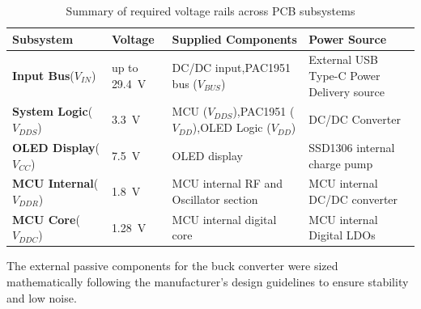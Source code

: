 \begin{table}[htbp]
    \centering
    \renewcommand{\arraystretch}{1.3}
    \caption{Summary of required voltage rails across PCB subsystems}
    \label{tab:voltage_summary}

    \begin{tabularx}{\textwidth}{|>{\centering\arraybackslash}m{2.5cm}|>{\centering\arraybackslash}m{2cm}|X|X|}
        \hline
        \textbf{Subsystem} &
        \textbf{Voltage} &
        \textbf{Supplied Components} &
        \textbf{Power Source} \\
        \hline

        \textbf{Input Bus}\newline($V_{IN}$) & 
        up to \SI{29.4}{\volt} & 
        DC/DC input,\newline PAC1951 bus ($V_{BUS}$) & 
        External USB Type-C Power Delivery source \\
        \hline

        \textbf{System Logic}\newline($V_{DDS}$) & 
        \SI{3.3}{\volt} & 
        MCU ($V_{DDS}$),\newline PAC1951 ($V_{DD}$),\newline OLED Logic ($V_{DD}$) & 
        DC/DC Converter \\
        \hline

        \textbf{OLED Display}\newline($V_{CC}$) & 
        \SI{7.5}{\volt} & 
        OLED display & 
        SSD1306 internal charge pump \\
        \hline

        \textbf{MCU Internal}\newline($V_{DDR}$) & 
        \SI{1.8}{\volt} & 
        MCU internal RF and Oscillator section& 
        MCU internal DC/DC converter \\
        \hline

        \textbf{MCU Core}\newline($V_{DDC}$) & 
        \SI{1.28}{\volt} & 
        MCU internal digital core & 
        MCU internal Digital LDOs \\
        \hline
        
    \end{tabularx}
\end{table}

The external passive components for the buck converter were sized mathematically following the manufacturer's design guidelines to ensure stability and low noise.

